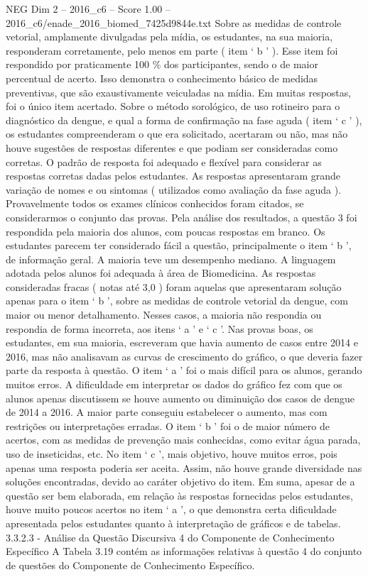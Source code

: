 \begin{textsample}{NEG Dim 2 – 2016\_c6 – Score 1.00 – 2016\_c6/enade\_2016\_biomed\_7425d9844e.txt}
Sobre as medidas de controle vetorial, amplamente divulgadas pela mídia, os estudantes, na sua maioria, responderam corretamente, pelo menos em parte ( item ‘ b ’ ).
Esse item foi respondido por praticamente 100 \% dos participantes, sendo o de maior percentual de acerto.
Isso demonstra o conhecimento básico de medidas preventivas, que são exaustivamente veiculadas na mídia.
Em muitas respostas, foi o único item acertado.
Sobre o método sorológico, de uso rotineiro para o diagnóstico da dengue, e qual a forma de confirmação na fase aguda ( item ‘ c ’ ), os estudantes compreenderam o que era solicitado, acertaram ou não, mas não houve sugestões de respostas diferentes e que podiam ser consideradas como corretas.
O padrão de resposta foi adequado e flexível para considerar as respostas corretas dadas pelos estudantes.
As respostas apresentaram grande variação de nomes e ou sintomas ( utilizados como avaliação da fase aguda ).
Provavelmente todos os exames clínicos conhecidos foram citados, se considerarmos o conjunto das provas.
Pela análise dos resultados, a questão 3 foi respondida pela maioria dos alunos, com poucas respostas em branco.
Os estudantes parecem ter considerado fácil a questão, principalmente o item ‘ b ’, de informação geral.
A maioria teve um desempenho mediano.
A linguagem adotada pelos alunos foi adequada à área de Biomedicina.
As respostas consideradas fracas ( notas até 3,0 ) foram aquelas que apresentaram solução apenas para o item ‘ b ’, sobre as medidas de controle vetorial da dengue, com maior ou menor detalhamento.
Nesses casos, a maioria não respondia ou respondia de forma incorreta, aos itens ‘ a ’ e ‘ c ’.
Nas provas boas, os estudantes, em sua maioria, escreveram que havia aumento de casos entre 2014 e 2016, mas não analisavam as curvas de crescimento do gráfico, o que deveria fazer parte da resposta à questão.
O item ‘ a ’ foi o mais difícil para os alunos, gerando muitos erros.
A dificuldade em interpretar os dados do gráfico fez com que os alunos apenas discutissem se houve aumento ou diminuição dos casos de dengue de 2014 a 2016.
A maior parte conseguiu estabelecer o aumento, mas com restrições ou interpretações erradas.
O item ‘ b ’ foi o de maior número de acertos, com as medidas de prevenção mais conhecidas, como evitar água parada, uso de inseticidas, etc.
No item ‘ c ’, mais objetivo, houve muitos erros, pois apenas uma resposta poderia ser aceita.
Assim, não houve grande diversidade nas soluções encontradas, devido ao caráter objetivo do item.
Em suma, apesar de a questão ser bem elaborada, em relação às respostas fornecidas pelos estudantes, houve muito poucos acertos no item ‘ a ’, o que demonstra certa dificuldade apresentada pelos estudantes quanto à interpretação de gráficos e de tabelas. 3.3.2.3 - Análise da Questão Discursiva 4 do Componente de Conhecimento Específico A Tabela 3.19 contém as informações relativas à questão 4 do conjunto de questões do Componente de Conhecimento Específico.

\end{textsample}
